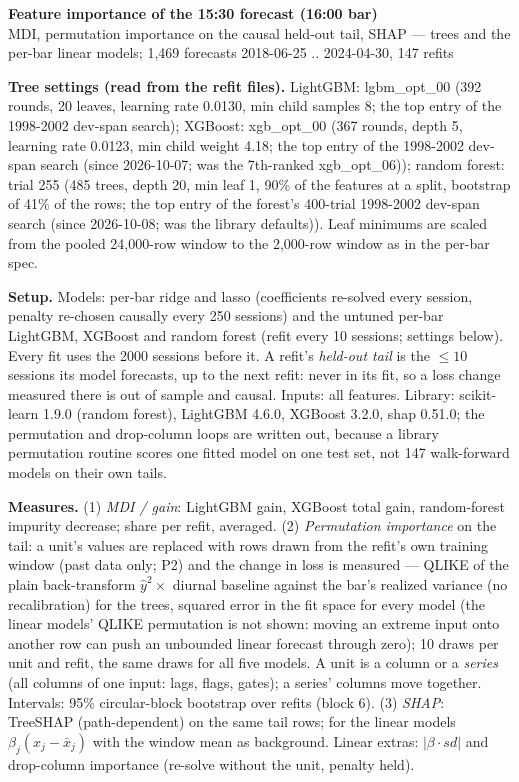 \documentclass[10pt]{article}
\begin{document}
\begin{center}{\Large\bf Feature importance of the 15:30 forecast (16:00 bar)}\\[3pt]
{\small MDI, permutation importance on the causal held-out tail, SHAP --- trees and the per-bar linear models; 1,469 forecasts 2018-06-25 .. 2024-04-30, 147 refits}\end{center}

\textbf{Tree settings (read from the refit files).} LightGBM: lgbm\_opt\_00 (392 rounds, 20 leaves, learning rate 0.0130, min child samples 8; the top entry of the 1998-2002 dev-span search); XGBoost: xgb\_opt\_00 (367 rounds, depth 5, learning rate 0.0123, min child weight 4.18; the top entry of the 1998-2002 dev-span search (since 2026-10-07; was the 7th-ranked xgb\_opt\_06)); random forest: trial 255 (485 trees, depth 20, min leaf 1, 90\% of the features at a split, bootstrap of 41\% of the rows; the top entry of the forest's 400-trial 1998-2002 dev-span search (since 2026-10-08; was the library defaults)). Leaf minimums are scaled from the pooled 24,000-row window to the 2,000-row window as in the per-bar spec.

\textbf{Setup.} Models: per-bar ridge and lasso (coefficients re-solved every session, penalty re-chosen causally every 250 sessions) and the untuned per-bar LightGBM, XGBoost and random forest (refit every 10 sessions; settings below). Every fit uses the 2000 sessions before it. A refit's \emph{held-out tail} is the $\le 10$ sessions its model forecasts, up to the next refit: never in its fit, so a loss change measured there is out of sample and causal. Inputs: all features. Library: scikit-learn 1.9.0 (random forest), LightGBM 4.6.0, XGBoost 3.2.0, shap 0.51.0; the permutation and drop-column loops are written out, because a library permutation routine scores one fitted model on one test set, not 147 walk-forward models on their own tails.

\textbf{Measures.} (1) \emph{MDI / gain}: LightGBM gain, XGBoost total gain, random-forest impurity decrease; share per refit, averaged. (2) \emph{Permutation importance} on the tail: a unit's values are replaced with rows drawn from the refit's own training window (past data only; P2) and the change in loss is measured --- QLIKE of the plain back-transform $\hat y^2\times$ diurnal baseline against the bar's realized variance (no recalibration) for the trees, squared error in the fit space for every model (the linear models' QLIKE permutation is not shown: moving an extreme input onto another row can push an unbounded linear forecast through zero); 10 draws per unit and refit, the same draws for all five models. A unit is a column or a \emph{series} (all columns of one input: lags, flags, gates); a series' columns move together. Intervals: 95\% circular-block bootstrap over refits (block 6). (3) \emph{SHAP}: TreeSHAP (path-dependent) on the same tail rows; for the linear models $\beta_j(x_j-\bar x_j)$ with the window mean as background. Linear extras: $|\beta\cdot sd|$ and drop-column importance (re-solve without the unit, penalty held).
\end{document}
